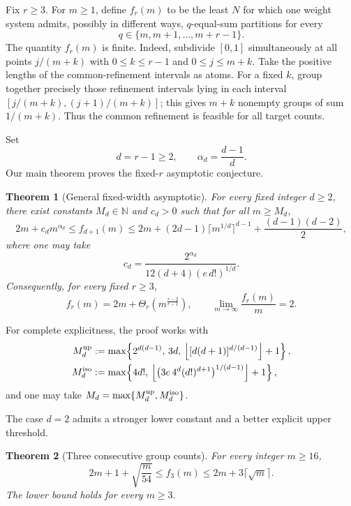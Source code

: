 \documentclass[11pt]{article}
\newtheorem{theorem}{Theorem}[section]
\theoremstyle{definition}
\newcommand{\N}{\mathbb{N}}
\newcommand{\1}{\mathbf{1}}
\begin{document}
Fix $r\ge3$.  For $m\ge1$, define $f_r(m)$ to be the least $N$ for which one weight system admits, possibly in different ways, $q$-equal-sum partitions for every
\[
  q\in\{m,m+1,\ldots,m+r-1\}.
\]
The quantity $f_r(m)$ is finite.  Indeed, subdivide $[0,1]$ simultaneously at all points $j/(m+k)$ with $0\le k\le r-1$ and $0\le j\le m+k$.  Take the positive lengths of the common-refinement intervals as atoms.  For a fixed $k$, group together precisely those refinement intervals lying in each interval $[j/(m+k),(j+1)/(m+k)]$; this gives $m+k$ nonempty groups of sum $1/(m+k)$.  Thus the common refinement is feasible for all target counts.

Set
\[
  d=r-1\ge2,\qquad \alpha_d=\frac{d-1}{d}.
\]
Our main theorem proves the fixed-$r$ asymptotic conjecture.

\begin{theorem}[General fixed-width asymptotic]\label{thm:main}
For every fixed integer $d\ge2$, there exist constants $M_d\in\N$ and $c_d>0$ such that for all $m\ge M_d$,
\begin{equation}\label{eq:main-precise}
  2m+c_d m^{\alpha_d}
  \le f_{d+1}(m)
  \le 2m+(2d-1)\lceil m^{1/d}\rceil^{d-1}
       +\frac{(d-1)(d-2)}2,
\end{equation}
where one may take
\begin{equation}\label{eq:cd}
  c_d=\frac{2^{\alpha_d}}
  {12(d+4)(e\,d!)^{1/d}}.
\end{equation}
Consequently, for every fixed $r\ge3$,
\[
  f_r(m)=2m+\Theta_r\!\left(m^{\frac{r-2}{r-1}}\right),
  \qquad
  \lim_{m\to\infty}\frac{f_r(m)}m=2.
\]
\end{theorem}

For complete explicitness, the proof works with
\begin{align}
 M_d^{\rm up}
 &:=\max\!\left\{
      2^{d(d-1)},\,3d,\,
      \left\lfloor[d(d+1)]^{d/(d-1)}\right\rfloor+1
     \right\},\label{eq:Mup}\\
 M_d^{\rm iso}
 &:=\max\!\left\{
      4d!,\,
      \left\lfloor
      \bigl(3e\,4^d(d!)^{d+1}\bigr)^{1/(d-1)}
      \right\rfloor+1
     \right\},\label{eq:Miso}
\end{align}
and one may take $M_d=\max\{M_d^{\rm up},M_d^{\rm iso}\}$.

The case $d=2$ admits a stronger lower constant and a better explicit upper threshold.

\begin{theorem}[Three consecutive group counts]\label{thm:three}
For every integer $m\ge16$,
\[
  2m+1+\sqrt{\frac{m}{54}}
  \le f_3(m)
  \le 2m+3\lceil\sqrt m\rceil.
\]
The lower bound holds for every $m\ge3$.
\end{theorem}
\end{document}
